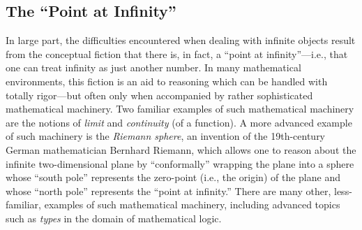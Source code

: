 
\subsection{The ``Point at Infinity''}
\label{sec:point-at-infinity}

In large part, the difficulties encountered when dealing with infinite
objects result from the conceptual fiction that there is, in fact, a
``point at infinity''---i.e., that one can treat infinity as just
another number.  In many mathematical environments, this fiction is an
aid to reasoning which can be handled with totally rigor---but often
only when accompanied by rather sophisticated mathematical machinery.
Two familiar examples of such mathematical machinery are the notions
of  {\it limit} and  {\it continuity}
(of a function).  A more advanced example of such machinery is the
{\it Riemann sphere},  an invention of the
19th-century German mathematician Bernhard Riemann,  
which allows one to reason about the infinite two-dimensional plane by
``conformally'' wrapping the plane into a sphere whose ``south pole''
represents the zero-point (i.e., the origin) of the plane and whose
``north pole'' represents the ``point at infinity.''  There are many
other, less-familiar, examples of such mathematical machinery,
including advanced topics such as {\it types} in the domain of
mathematical logic.

